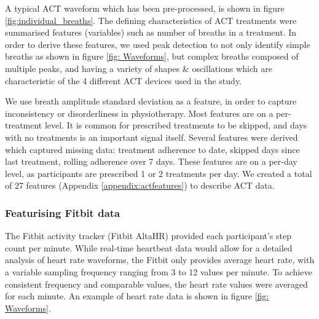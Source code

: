 \documentclass{article}
\begin{document}
A typical ACT waveform which has been pre-processed, is shown in figure \ref{fig:individual_breaths}. The defining characteristics of ACT treatments were summarised features (variables) such as number of breaths in a treatment. In order to derive these features, we used peak detection to not only identify simple breaths as shown in figure \ref{fig: Waveforms}, but complex breaths composed of multiple peaks, and having a variety of shapes & oscillations which are characteristic of the 4 different ACT devices used in the study. 

We use breath amplitude standard deviation as a feature, in order to capture inconsistency or disorderliness in physiotherapy. Most features are on a per-treatment level. It is common for prescribed treatments to be skipped, and days with no treatments is an important signal itself. Several features were derived which captured missing data: treatment adherence to date, skipped days since last treatment, rolling adherence over 7 days. These features are on a per-day level, as participants are prescribed 1 or 2 treatments per day. We created a total of 27 features (Appendix \ref{appendix:actfeatures}) to describe ACT data. 

\subsubsection{Featurising Fitbit data}

The Fitbit activity tracker (Fitbit AltaHR) provided each participant’s step count per minute. While real-time heartbeat data would allow for a detailed analysis of heart rate waveforms, the Fitbit only provides average heart rate, with a variable sampling frequency ranging from 3 to 12 values per minute. To achieve consistent frequency and comparable values, the heart rate values were averaged for each minute. An example of heart rate data is shown in figure \ref{fig: Waveforms}.
\end{document}
